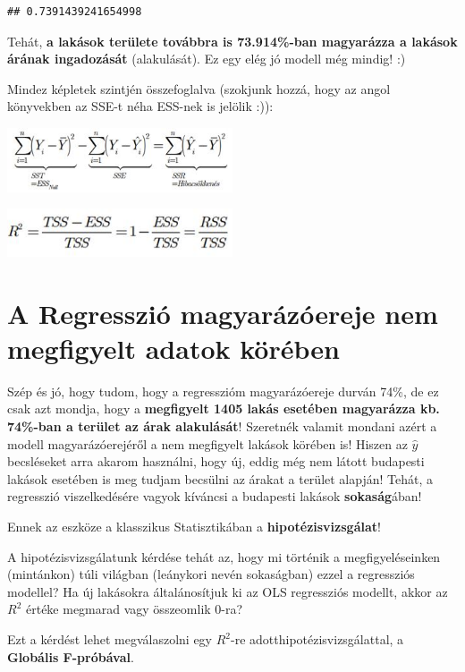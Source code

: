 \documentclass[
]{book}
\begin{document}
\begin{verbatim}
## 0.7391439241654998
\end{verbatim}

Tehát, \textbf{a lakások területe továbbra is 73.914\%-ban magyarázza a lakások árának ingadozását} (alakulását). Ez egy elég jó modell még mindig! :)

Mindez képletek szintjén összefoglalva (szokjunk hozzá, hogy az angol könyvekben az SSE-t néha ESS-nek is jelölik :)):

\includegraphics[width=0.5\textwidth,height=\textheight]{SS_felbontas.jpg}

\includegraphics[width=0.5\textwidth,height=\textheight]{Rnegyzet.jpg}

\section{A Regresszió magyarázóereje nem megfigyelt adatok körében}\label{a-regressziuxf3-magyaruxe1zuxf3ereje-nem-megfigyelt-adatok-kuxf6ruxe9ben}

Szép és jó, hogy tudom, hogy a regresszióm magyarázóereje durván 74\%, de ez csak azt mondja, hogy a \textbf{megfigyelt 1405 lakás esetében magyarázza kb. 74\%-ban a terület az árak alakulását}! Szeretnék valamit mondani azért a modell magyarázóerejéről a nem megfigyelt lakások körében is! Hiszen az \(\hat{y}\) becsléseket arra akarom használni, hogy új, eddig még nem látott budapesti lakások esetében is meg tudjam becsülni az árakat a terület alapján! Tehát, a regresszió viszelkedésére vagyok kíváncsi a budapesti lakások \textbf{sokaság}ában!

Ennek az eszköze a klasszikus Statisztikában a \textbf{hipotézisvizsgálat}!

A hipotézisvizsgálatunk kérdése tehát az, hogy mi történik a megfigyeléseinken (mintánkon) túli világban (leánykori nevén sokaságban) ezzel a regressziós modellel? Ha új lakásokra általánosítjuk ki az OLS regressziós modellt, akkor az \(R^2\) értéke megmarad vagy összeomlik 0-ra?

Ezt a kérdést lehet megválaszolni egy \(R^2\)-re adotthipotézisvizsgálattal, a \textbf{Globális F-próbával}.
\end{document}
